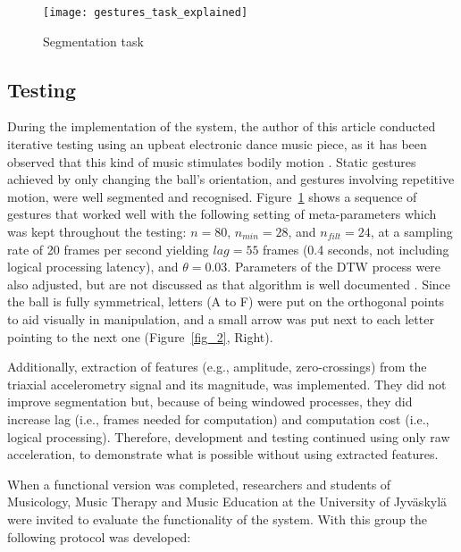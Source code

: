 \documentclass{nime-alternate_ADJ} %
\begin{document}
\begin{figure}[t!]
	\centering
		\texttt{[image: gestures\_task\_explained]}
	\caption{Segmentation task}
	\label{fig_6}
\end{figure}


\subsection{Testing}\label{Testing}

During the implementation of the system, the author of this article conducted iterative testing using an upbeat electronic dance music piece, as it has been observed that this kind of music stimulates bodily motion  \cite{Burger_Toiviainen_2020}. Static gestures achieved by only changing the ball's orientation, and gestures involving repetitive motion, were well segmented and recognised.  Figure~\ref{fig_6} shows a sequence of gestures that worked well with the following setting of meta-parameters which was kept throughout the testing: $n = 80$, $n_{min} = 28$, and $n_{filt} = 24$, at a sampling rate of 20 frames per second yielding $lag = 55$ frames (0.4 seconds, not including logical processing latency), and $\theta = 0.03$. Parameters of the DTW process were also adjusted, but are not discussed as that algorithm is well documented \cite{Gillian_etal_2011, Wekinator_website}. Since the ball is fully symmetrical, letters (A to F) were put on the orthogonal points to aid visually in manipulation, and a small arrow was put next to each letter pointing to the next one (Figure~\ref{fig_2}, Right).  

Additionally, extraction of features (e.g., amplitude, zero-crossings) from the triaxial accelerometry signal and its magnitude, was implemented. They did not improve segmentation but, because of being windowed processes, they did increase lag (i.e., frames needed for computation) and computation cost (i.e., logical processing). Therefore, development and testing continued using only raw acceleration, to demonstrate what is possible without using extracted features. 

When a functional version was completed, researchers and students of Musicology, Music Therapy and Music Education at the 
University of Jyväskylä
were invited to evaluate the functionality of the system. With this group the following protocol was developed:
\end{document}
